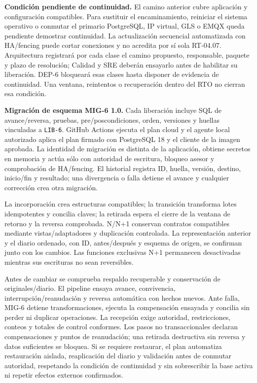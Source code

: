 \textbf{Condición pendiente de continuidad.}
El camino anterior cubre aplicación y configuración compatibles. Para sustituir el encaminamiento, reiniciar el sistema operativo o conmutar el primario PostgreSQL, IP virtual, GLS o EMQX queda pendiente demostrar continuidad. La actualización secuencial automatizada con HA/fencing puede cortar conexiones y no acredita por sí sola RT-04.07. Arquitectura registrará por cada clase el camino propuesto, responsable, paquete y plazo de resolución; Calidad y SRE deberán ensayarlo antes de habilitar su liberación. DEP-6 bloqueará esas clases hasta disponer de evidencia de continuidad. Una ventana, reintentos o recuperación dentro del RTO no cierran esa condición.

\textbf{Migración de esquema MIG-6 1.0.}
Cada liberación incluye SQL de avance/reversa, pruebas, pre/poscondiciones, orden, versiones y huellas vinculadas a \texttt{LIB-6}. GitHub Actions ejecuta el plan cloud y el agente local autorizado aplica el plan firmado con PostgreSQL 18 y el cliente de la imagen aprobada. La identidad de migración es distinta de la aplicación, obtiene secretos en memoria y actúa sólo con autoridad de escritura, bloqueo asesor y comprobación de HA/fencing. El historial registra ID, huella, versión, destino, inicio/fin y resultado; una divergencia o falla detiene el avance y cualquier corrección crea otra migración.

La incorporación crea estructuras compatibles; la transición transforma lotes idempotentes y concilia claves; la retirada espera el cierre de la ventana de retorno y la reversa comprobada. N/N+1 conservan contratos compatibles mediante vistas/adaptadores y duplicación controlada. La representación anterior y el diario ordenado, con ID, antes/después y esquema de origen, se confirman junto con los cambios. Las funciones exclusivas N+1 permanecen desactivadas mientras sus escrituras no sean reversibles.

Antes de cambiar se comprueba respaldo recuperable y conservación de originales/diario. El pipeline ensaya avance, convivencia, interrupción/reanudación y reversa automática con hechos nuevos. Ante falla, MIG-6 detiene transformaciones, ejecuta la compensación ensayada y concilia sin perder ni duplicar operaciones. La recepción exige autoridad, restricciones, conteos y totales de control conformes. Los pasos no transaccionales declaran compensaciones y puntos de reanudación; una retirada destructiva sin reversa y datos suficientes se bloquea. Si se requiere restaurar, el plan automatiza restauración aislada, reaplicación del diario y validación antes de conmutar autoridad, respetando la condición de continuidad y sin sobrescribir la base activa ni repetir efectos externos confirmados.

